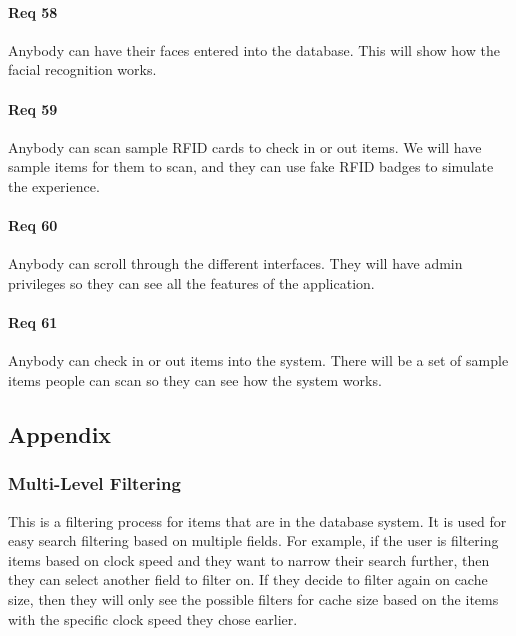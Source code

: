 \documentclass[10pt, onecolumn, twoside, peerreview]{IEEEtran}
\begin{document}
\paragraph*{Req 58} Anybody can have their faces entered into the database. This will show how the facial recognition works.\\

\paragraph*{Req 59} Anybody can scan sample RFID cards to check in or out items. We will have sample items for them to scan, and they can
use fake RFID badges to simulate the experience.\\

\paragraph*{Req 60} Anybody can scroll through the different interfaces. They will have admin privileges so they can see all the features
of the application.\\

\paragraph*{Req 61} Anybody can check in or out items into the system. There will be a set of sample items people can scan so they can see
how the system works.\\

\subsection{Appendix}
\subsubsection{Multi-Level Filtering}
This is a filtering process for items that are in the database system. It is used for easy search filtering based on
multiple fields. For example, if the user is filtering items based on clock speed and they want to narrow their search
further, then they can select another field to filter on. If they decide to filter again on cache size, then they will
only see the possible filters for cache size based on the items with the specific clock speed they chose earlier.\\
\end{document}
